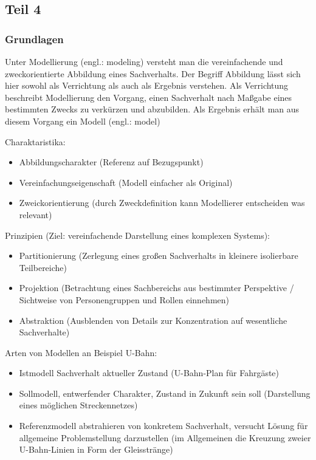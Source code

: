 \subsection{Teil 4}
\subsubsection{Grundlagen}

Unter Modellierung (engl.: modeling) versteht man die vereinfachende und zweckorientierte Abbildung eines Sachverhalts. Der Begriff Abbildung lässt sich hier sowohl als Verrichtung als auch als Ergebnis verstehen. Als Verrichtung beschreibt Modellierung den Vorgang, einen Sachverhalt nach Maßgabe eines bestimmten Zwecks zu verkürzen und abzubilden. Als Ergebnis erhält man aus diesem Vorgang ein Modell (engl.: model)
\par
Charaktaristika:
\begin{itemize}
 \item Abbildungscharakter (Referenz auf Bezugspunkt)
 \item Vereinfachungseigenschaft (Modell einfacher als Original) 
 \item Zweickorientierung (durch Zweckdefinition kann Modellierer entscheiden was relevant)
\end{itemize}

Prinzipien (Ziel: vereinfachende Darstellung eines komplexen Systems):
\begin{itemize}
 \item Partitionierung (Zerlegung eines großen Sachverhalts in kleinere isolierbare Teilbereiche)
 \item Projektion (Betrachtung eines Sachbereichs aus bestimmter Perspektive / Sichtweise von Personengruppen und Rollen einnehmen)
 \item Abstraktion (Ausblenden von Details zur Konzentration auf wesentliche Sachverhalte)
\end{itemize}

Arten von Modellen an Beispiel U-Bahn:
\begin{itemize}
 \item Istmodell Sachverhalt aktueller Zustand (U-Bahn-Plan für Fahrgäste)
 \item Sollmodell, entwerfender Charakter, Zustand in Zukunft sein soll (Darstellung eines möglichen Streckennetzes)
 \item Referenzmodell abstrahieren von konkretem Sachverhalt, versucht Lösung für allgemeine Problemstellung darzustellen  (im Allgemeinen die Kreuzung zweier U-Bahn-Linien in Form der Gleisstränge)
\end{itemize}

